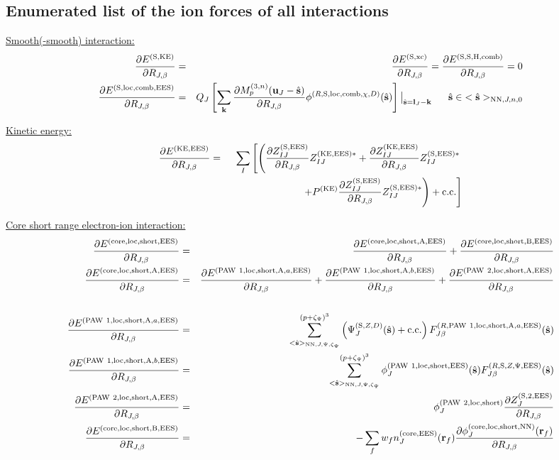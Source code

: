 \documentclass[paper=a4, fontsize=11pt]{article} %
\numberwithin{equation}{section} %
\numberwithin{figure}{section} %
\numberwithin{table}{section} %
\newcommand{\p}{\partial}
\newcommand{\bu}{{\bf{u}}}
\newcommand{\bl}{{\bf{l}}}
\newcommand{\bk}{{\bf{k}}}
\newcommand{\bs}{{\bf{s}}}
\newcommand{\br}{{\bf{r}}}
\newcommand{\hs}{{\hat{\bf{s}}}}
\newcommand{\rS}{{\mathrm{S}}}
\newcommand{\rKE}{{\mathrm{KE}}}
\newcommand{\rEES}{{\mathrm{EES}}}
\newcommand{\rxc}{{\mathrm{xc}}}
\newcommand{\rcore}{{\mathrm{core}}}
\newcommand{\rNN}{{\mathrm{NN}}}
\newcommand{\rshort}{{\mathrm{short}}}
\newcommand{\rcc}{{\mathrm{c.c.}}}
\newcommand{\rP}{{\mathrm{PAW}}}
\newcommand{\rH}{{\mathrm{H}}}
\newcommand{\rA}{{\mathrm{A}}}
\newcommand{\rB}{{\mathrm{B}}}
\newcommand{\rcomb}{{\mathrm{comb}}}
\newcommand{\rlo}{{\mathrm{loc}}}
\newcommand{\RJb}{{R_{J,\beta}}}
\newcommand{\pzp}{{(p+\zeta_{\Psi})^3}}
\newcommand{\hsJp}{{<\hs>_{\rNN,J,\Psi,\zeta_\Psi}}}
\newcommand{\hsJnzr}{{<\hs>_{\rNN,J,n,0}}}
\newcommand{\hsinJnzr}{{\ \ \ \ \ \hs  \in  \hsJnzr}}
\begin{document}
\subsection{Enumerated list of the ion forces of all interactions}

\underline{Smooth(-smooth) interaction:}
\begin{eqnarray}
\label{gr:dESdR}
\frac{\p E^{(\rS,\rKE)}}{ \p \RJb} 
&=& \frac{\p E^{(\rS,\rxc)}}{\p \RJb} =\frac{\p E^{(\rS,\rS,\rH,\rcomb)}}{\p \RJb}=  0 \\
\frac{\p E^{(\rS,\rlo,\rcomb,\rEES)}}{ \p \RJb}
&=& Q_J \left[ \sum_{\bk} \frac{\p M_p^{(3,n)}(\bu_{J}-\hat \bs)}{\p \RJb} \phi^{(R,\rS,\rlo,\rcomb,\chi,D)}(\hs)\right]\big|_{\hat \bs=\bl_J-\bk} \hsinJnzr
\end{eqnarray}

\underline{Kinetic energy:}
\begin{eqnarray}
\label{gr:dEKEdR}
\frac{\p E^{(\rKE,\rEES)}}{ \p \RJb}
&=& \sum_I \left[\left(\frac{\p Z_{IJ}^{(\rS,\rEES)}}{\p \RJb} Z_{IJ}^{(\rKE,\rEES)*} +\frac{\p Z_{IJ}^{(\rKE,\rEES)}}{\p \RJb}Z_{IJ}^{(\rS,\rEES)*} \right. \right. \nonumber \\ 
&&\hspace*{1in} \left.\left. + P^{(\rKE)}\frac{\p Z_{IJ}^{(\rS,\rEES)}}{\p \RJb} Z_{IJ}^{(\rS,\rEES)*}\right) + \rcc \right]
\end{eqnarray}

\underline{Core short range electron-ion interaction:}
\begin{eqnarray}
\label{gr:dElocSEESdR}
\frac{\p E^{(\rcore,\rlo,\rshort,\rEES)}}{\p \RJb}
&=& \frac{\p E^{(\rcore,\rlo,\rshort,\rA,\rEES)} }{\p \RJb}+\frac{\p E^{(\rcore,\rlo,\rshort,\rB,\rEES)}}{\p \RJb} \\
\frac{\p E^{(\rcore,\rlo,\rshort,\rA,\rEES)} }{\p \RJb}
&=& \frac{\p E^{(\rP\ 1,\rlo,\rshort,\rA,a,\rEES)}}{\p \RJb} + \frac{\p E^{(\rP\ 1,\rlo,\rshort,\rA,b,\rEES)}}{\p \RJb} + \frac{\p E^{(\rP\ 2,\rlo,\rshort,\rA,\rEES)}}{\p \RJb} \nonumber \\ \\
\label{gr:dElocshosrt1AadR}
\frac{\p E^{(\rP\ 1,\rlo,\rshort,\rA,a,\rEES)}}{\p \RJb}
&=& \sum_{\hsJp}^{\pzp} \left(\Psi_J^{(\rS,Z,D)}(\hat \bs)+ \rcc\right) F_{J\beta}^{(R,\rP\ 1,\rlo,\rshort,\rA,a,\rEES)}(\hs)\\
\label{gr:dElocshosrt1AbdR}
\frac{\p E^{(\rP\ 1,\rlo,\rshort,\rA,b,\rEES)}}{\p \RJb}
&=& \sum_{\hsJp}^{\pzp}\phi_J^{(\rP\ 1,\rlo,\rshort,\rEES)}(\hs) F_{J\beta}^{(R,\rS,Z,\Psi,\rEES)}(\hs) \\
\label{gr:dElocshosrt2AdR}
\frac{\p E^{(\rP\ 2,\rlo,\rshort,\rA,\rEES)}}{\p \RJb}
&=&\phi_J^{(\rP\ 2,\rlo,\rshort)}\frac{\p Z_{J}^{(\rS,2,\rEES)}}{\p \RJb}\\
\label{gr:dElocshortBdR}
\frac{\p E^{(\rcore,\rlo,\rshort,\rB,\rEES)}}{\p \RJb}
&=& -\sum_f w_f  n_{J}^{(\rcore,\rEES)}(\br_f) \frac{\p \phi_J^{(\rcore,\rlo,\rshort,\rNN)}(\br_f)}{\p \RJb} \\
\end{eqnarray}
\end{document}
